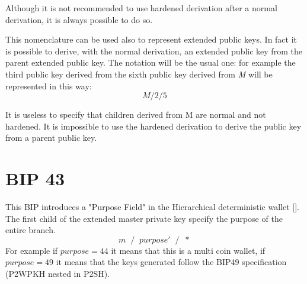 \begin{remark}
	Although it is not recommended to use hardened derivation after a normal derivation, it is always possible to do so.
\end{remark}
This nomenclature can be used also to represent extended public keys. In fact it is possible to derive, with the normal derivation, an extended public key from the parent extended public key. The notation will be the usual one: for example the third public key derived from the sixth public key derived from \textit{M} will be represented in this way:
\begin{equation*}
M /2/5
\end{equation*}

\begin{remark}
It is useless to specify that children derived from M are normal and not hardened. It is impossible to use the hardened derivation to derive the public key from a parent public key.
\end{remark}

  
\section{BIP 43}
This BIP introduces a "Purpose Field" in the Hierarchical deterministic wallet [\cite{4}]. The first child of the extended master private key specify the purpose of the entire branch.
\begin{equation*}
m\; \;/\;\; purpose'\;\; /\;\; *
\end{equation*}
For example if $purpose=44$ it means that this is a multi coin wallet, if $purpose=49$ it means that the keys generated follow the BIP49 specification (P2WPKH nested in P2SH).

